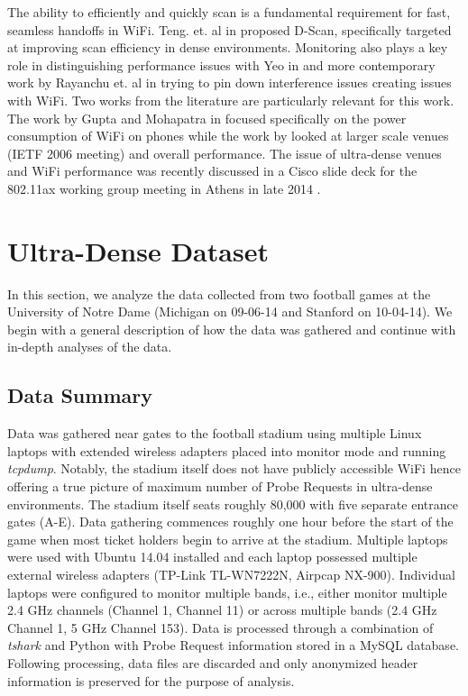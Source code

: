 \documentclass[conference]{IEEEtran}
\begin{document}
The ability to efficiently and quickly scan is a fundamental requirement for fast, seamless handoffs in WiFi.  Teng. et. al in \cite{Teng:INFOCOM09:DScan} proposed D-Scan, specifically targeted at improving scan efficiency in dense environments. Monitoring also plays a key role in distinguishing performance issues with Yeo in \cite{Yeo:WiSe04:LANMonitor} and more contemporary work by Rayanchu et. al in \cite{Rayanchu:NSDI12:WiFiNet} trying to pin down interference issues creating issues with WiFi.  Two works from the literature are particularly relevant for this work. The work by Gupta and Mohapatra in \cite{Gupta:SECON07:WifiPhone} focused specifically on the power consumption of WiFi on phones while the work by \cite{Raghavendra:TMC10:UnwantedLink} looked at larger scale venues (IETF 2006 meeting) and overall performance.  The issue of ultra-dense venues and WiFi performance was recently discussed in a Cisco slide deck for the 802.11ax working group meeting in Athens in late 2014 \cite{Cisco:Athens:80211ax}.


\section{Ultra-Dense Dataset}

In this section, we analyze the data collected from two football games at the University of Notre Dame (Michigan on 09-06-14 and Stanford on 10-04-14). We begin with a general description of how the data was gathered and continue with in-depth analyses of the data.  

\subsection{Data Summary}

Data was gathered near gates to the football stadium using multiple Linux laptops with extended wireless adapters placed into monitor mode and running \emph{tcpdump}.  Notably, the stadium itself does not have publicly accessible WiFi hence offering a true picture of maximum number of Probe Requests in ultra-dense environments. The stadium itself seats roughly 80,000 with five separate entrance gates (A-E). Data gathering commences roughly one hour before the start of the game when most ticket holders begin to arrive at the stadium. Multiple laptops were used with Ubuntu 14.04 installed and each laptop possessed multiple external wireless adapters (TP-Link TL-WN7222N, Airpcap NX-900). Individual laptops were configured to monitor multiple bands, i.e., either monitor multiple 2.4 GHz channels (Channel 1, Channel 11) or across multiple bands (2.4 GHz Channel 1, 5 GHz Channel 153). Data is processed through a combination of \emph{tshark} and Python with Probe Request information stored in a MySQL database. Following processing, data files are discarded and only anonymized header information is preserved for the purpose of analysis. 
\end{document}
